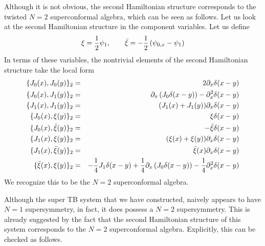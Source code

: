 \documentclass[a4paper,11pt]{article}
\begin{document}
Although it is not obvious, the second Hamiltonian structure
corresponds to the twisted $N=2$ superconformal algebra, which can be
seen as follows. Let us look at the second Hamiltonian structure in
the component variables. Let us define
\begin{equation}
\xi = {1\over 2} \psi_{1},\qquad \bar{\xi} = - {1\over 2}
\left(\psi_{0,x} - \psi_{1}\right)
\end{equation}
In terms of these variables, the nontrivial elements of the second
Hamiltonian structure take the local form
\begin{eqnarray}
\{J_{0}(x),J_{0}(y)\}_{2} & = & 2 \partial_{x}\delta(x-y)\nonumber\\
\{J_{0}(x),J_{1}(y)\}_{2} & = &
\partial_{x}\left(J_{0}\delta(x-y)\right) -
\partial_{x}^{2}\delta(x-y)\nonumber\\
\{J_{1}(x),J_{1}(y)\}_{2} & = & (J_{1}(x)+J_{1}(y)) \partial_{x}\delta
(x-y)\nonumber\\
\{J_{0}(x),\xi (y)\}_{2} & = & \xi \delta (x-y)\nonumber\\
\{J_{0}(x),\bar{\xi} (y) \}_{2} & = & - \bar{\xi} \delta
(x-y)\nonumber\\
\{J_{1} (x), \xi (y)\}_{2} & = & (\xi (x) + \xi (y)) \partial_{x}
\delta (x-y)\nonumber\\
\{J_{1} (x), \bar{\xi} (y)\}_{2} & = & \bar{\xi}(x) \partial_{x}\delta
(x-y)\nonumber\\
\{\bar{\xi} (x), \xi (y)\}_{2} & = & -{1\over 4} J_{1} \delta (x-y) +
{1\over 4} \partial_{x}\left(J_{0}\delta (x-y)\right) - {1\over 4}
\partial_{x}^{2} \delta (x-y)
\end{eqnarray}
We recognize this to be the $N=2$ superconformal algebra.


Although the super TB system that we have constructed, naively appears
to have $N=1$ supersymmetry, in fact, it does possess a $N=2$
supersymmetry. This is already suggested by the fact that the second
Hamiltonian structure of this system corresponds to the $N=2$
superconformal algebra. Explicitly, this can be checked as follows.
\end{document}
